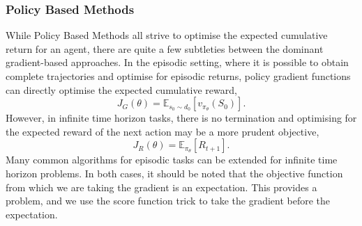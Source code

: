 \subsubsection{Policy Based Methods}
While Policy Based Methods all strive to optimise the expected cumulative return for an agent, there are quite a few subtleties between the dominant gradient-based approaches. In the episodic setting, where it is possible to obtain complete trajectories and optimise for episodic returns, policy gradient functions can directly optimise the expected cumulative reward,
\begin{equation}
	J_G(\theta) = \mathbb{E}_{s_0 \sim d_0}\left[v_{\pi_{\theta}}(S_0)\right].
\end{equation}
However, in infinite time horizon tasks, there is no termination and optimising for the expected reward of the next action may be a more prudent objective,
\begin{equation}
	J_R(\theta)
	= \mathbb{E}_{\pi_{\theta}}\left[R_{t+1}\right].
\end{equation}
Many common algorithms for episodic tasks can be extended for infinite time horizon problems.
In both cases, it should be noted that the objective function from which we are taking the gradient is an expectation. This provides a problem, and we use the score function trick to take the gradient before the expectation.

